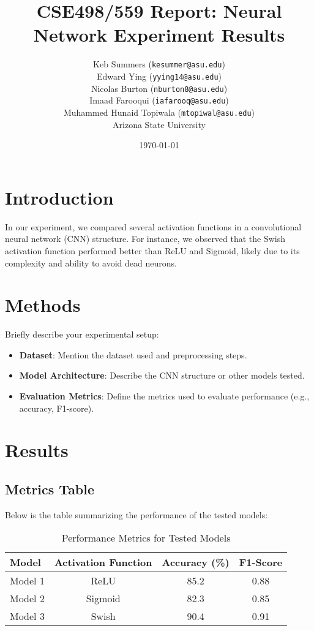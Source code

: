 \documentclass[11pt]{article}
\title{CSE498/559 Report: Neural Network Experiment Results}
\author{
Keb Summers (\texttt{kesummer@asu.edu})\\
Edward Ying (\texttt{yying14@asu.edu})\\
Nicolas Burton (\texttt{nburton8@asu.edu})\\
Imaad Farooqui (\texttt{iafarooq@asu.edu})\\
Muhammed Hunaid Topiwala (\texttt{mtopiwal@asu.edu})\\
\vspace{1em}
Arizona State University
}
\date{\today}
\begin{document}
\maketitle

\section*{Introduction}
In our experiment, we compared several activation functions in a convolutional neural network (CNN) structure. For instance, we observed that the Swish activation function performed better than ReLU and Sigmoid, likely due to its complexity and ability to avoid dead neurons.

\section*{Methods}
Briefly describe your experimental setup:
\begin{itemize}
    \item \textbf{Dataset}: Mention the dataset used and preprocessing steps.
    \item \textbf{Model Architecture}: Describe the CNN structure or other models tested.
    \item \textbf{Evaluation Metrics}: Define the metrics used to evaluate performance (e.g., accuracy, F1-score).
\end{itemize}

\section*{Results}
\subsection*{Metrics Table}
Below is the table summarizing the performance of the tested models:

\begin{table}[h!]
\centering
\caption{Performance Metrics for Tested Models}
\begin{tabular}{@{}lccc@{}}
\toprule
\textbf{Model} & \textbf{Activation Function} & \textbf{Accuracy (\%)} & \textbf{F1-Score} \\ 
\midrule
Model 1        & ReLU                         & 85.2                  & 0.88              \\ 
Model 2        & Sigmoid                      & 82.3                  & 0.85              \\ 
Model 3        & Swish                        & 90.4                  & 0.91              \\ 
\bottomrule
\end{tabular}
\label{tab:metrics}
\end{table}
\end{document}
